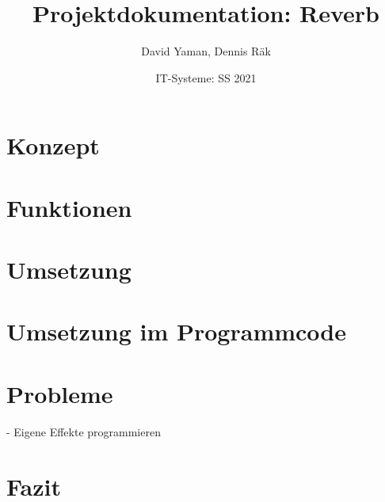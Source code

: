 \documentclass[12pt]{article}
\title{Projektdokumentation: Reverb}        %
\author{David Yaman, Dennis Räk}            %
\date{IT-Systeme: SS 2021}                    %
\begin{document}
\maketitle
\newpage
\section{Konzept}
\section{Funktionen}
\section{Umsetzung}
\section{Umsetzung im Programmcode}
\section{Probleme}
- Eigene Effekte programmieren
\section{Fazit}
\end{document}
